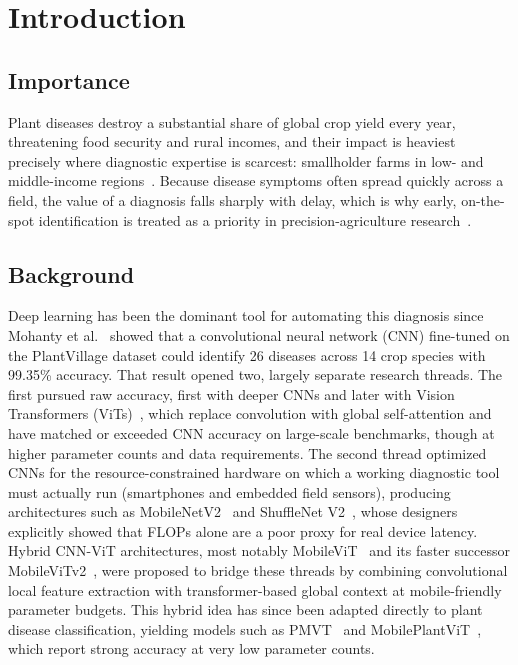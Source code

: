 \documentclass[conference]{IEEEtran}
\begin{document}
\IEEEpeerreviewmaketitle

\section{Introduction}

\subsection{Importance}

Plant diseases destroy a substantial share of global crop yield every year, threatening food security and rural incomes, and their impact is heaviest precisely where diagnostic expertise is scarcest: smallholder farms in low- and middle-income regions~\cite{mohanty2016plant}. Because disease symptoms often spread quickly across a field, the value of a diagnosis falls sharply with delay, which is why early, on-the-spot identification is treated as a priority in precision-agriculture research~\cite{tonmoy2025mobileplantvit}.

\subsection{Background}

Deep learning has been the dominant tool for automating this diagnosis since Mohanty et al.~\cite{mohanty2016plant} showed that a convolutional neural network (CNN) fine-tuned on the PlantVillage dataset could identify 26 diseases across 14 crop species with 99.35\% accuracy. That result opened two, largely separate research threads. The first pursued raw accuracy, first with deeper CNNs and later with Vision Transformers (ViTs)~\cite{dosovitskiy2021vit}, which replace convolution with global self-attention and have matched or exceeded CNN accuracy on large-scale benchmarks, though at higher parameter counts and data requirements. The second thread optimized CNNs for the resource-constrained hardware on which a working diagnostic tool must actually run (smartphones and embedded field sensors), producing architectures such as MobileNetV2~\cite{sandler2018mobilenetv2} and ShuffleNet V2~\cite{ma2018shufflenetv2}, whose designers explicitly showed that FLOPs alone are a poor proxy for real device latency. Hybrid CNN-ViT architectures, most notably MobileViT~\cite{mehta2022mobilevit} and its faster successor MobileViTv2~\cite{mehta2022mobilevitv2}, were proposed to bridge these threads by combining convolutional local feature extraction with transformer-based global context at mobile-friendly parameter budgets. This hybrid idea has since been adapted directly to plant disease classification, yielding models such as PMVT~\cite{li2023pmvt} and MobilePlantViT~\cite{tonmoy2025mobileplantvit}, which report strong accuracy at very low parameter counts.
\end{document}
